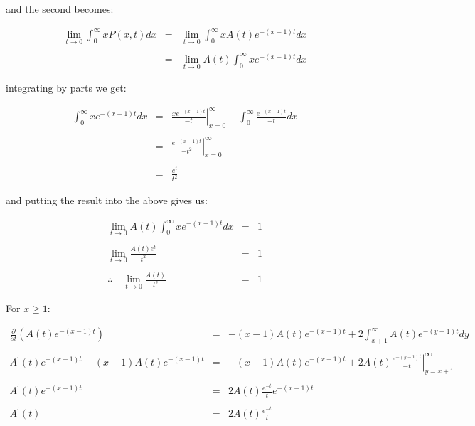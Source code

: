 and the second becomes: \bigskip

\begin{eqnarray*}
	\lim_{t \to 0} \int_{0}^{\infty} x P(x, t) dx & = & \lim_{t \to 0} \int_{0}^{\infty} x A(t) e^{-(x - 1)t} dx \\\\
												  & = & \lim_{t \to 0} A(t) \int_{0}^{\infty} x e^{-(x - 1)t} dx 
\end{eqnarray*}\medskip

integrating by parts we get: \bigskip

\begin{eqnarray*}
	\int_{0}^{\infty} x e^{-(x - 1)t} dx & = & \left. \frac{x e^{-(x - 1)t}}{-t} \right|_{x = 0}^{\infty} - \int_{0}^{\infty} \frac{e^{-(x - 1)t}}{-t} dx \\\\
										 & = & \left. \frac{e^{-(x - 1)t}}{-t^2} \right|_{x = 0}^{\infty} \\\\
										 & = & \frac{e^t}{t^2}
\end{eqnarray*}\medskip

and putting the result into the above gives us: \bigskip

\begin{eqnarray*}
	\lim_{t \to 0} A(t) \int_{0}^{\infty} x e^{-(x - 1)t} dx & = & 1 \\\\
						 \lim_{t \to 0} \frac{A(t) e^t}{t^2} & = & 1 \\\\
			\therefore \quad \lim_{t \to 0} \frac{A(t)}{t^2} & = & 1
\end{eqnarray*}\medskip

For $x \geq 1$: \bigskip

\begin{eqnarray*}
			\frac{\partial}{\partial t} (A(t) e^{-(x - 1)t}) & = & -(x - 1) A(t) e^{-(x - 1)t} + 2 \int_{x + 1}^{\infty} A(t) e^{-(y - 1)t} dy \\\\
	A^{\prime}(t) e^{-(x - 1)t} - (x - 1) A(t) e^{-(x - 1)t} & = & -(x - 1) A(t) e^{-(x - 1)t} + 2 A(t) \left. \frac{e^{-(y - 1)t}}{-t} \right|_{y = x + 1}^{\infty} \\\\
								 A^{\prime}(t) e^{-(x - 1)t} & = & 2 A(t) \frac{e^{-t}}{t} e^{-(x - 1)t} \\\\
 											   A^{\prime}(t) & = & 2 A(t) \frac{e^{-t}}{t}  
\end{eqnarray*}\medskip

